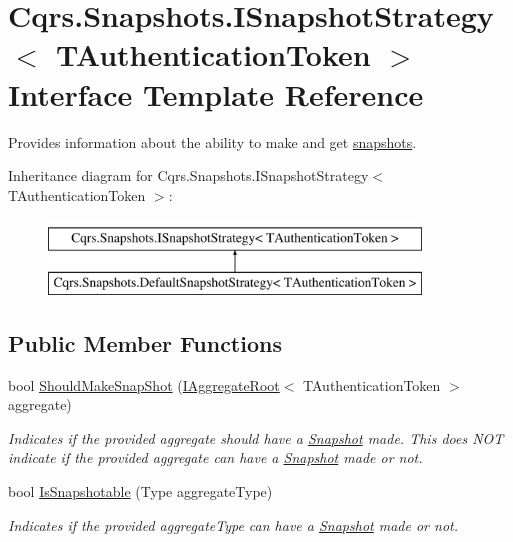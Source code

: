 \hypertarget{interfaceCqrs_1_1Snapshots_1_1ISnapshotStrategy}{}\section{Cqrs.\+Snapshots.\+I\+Snapshot\+Strategy$<$ T\+Authentication\+Token $>$ Interface Template Reference}
\label{interfaceCqrs_1_1Snapshots_1_1ISnapshotStrategy}


Provides information about the ability to make and get \hyperlink{classCqrs_1_1Snapshots_1_1Snapshot}{snapshots}.  


Inheritance diagram for Cqrs.\+Snapshots.\+I\+Snapshot\+Strategy$<$ T\+Authentication\+Token $>$\+:\begin{figure}[H]
\begin{center}
\leavevmode
\includegraphics[height=2.000000cm]{interfaceCqrs_1_1Snapshots_1_1ISnapshotStrategy}
\end{center}
\end{figure}
\subsection*{Public Member Functions}
\begin{DoxyCompactItemize}
\item 
bool \hyperlink{interfaceCqrs_1_1Snapshots_1_1ISnapshotStrategy_ab1d54cd76c7ac832329cb3a6de0effcd_ab1d54cd76c7ac832329cb3a6de0effcd}{Should\+Make\+Snap\+Shot} (\hyperlink{interfaceCqrs_1_1Domain_1_1IAggregateRoot}{I\+Aggregate\+Root}$<$ T\+Authentication\+Token $>$ aggregate)
\begin{DoxyCompactList}\small\item\em Indicates if the provided {\itshape aggregate}  should have a \hyperlink{classCqrs_1_1Snapshots_1_1Snapshot}{Snapshot} made. This does N\+OT indicate if the provided {\itshape aggregate}  can have a \hyperlink{classCqrs_1_1Snapshots_1_1Snapshot}{Snapshot} made or not. \end{DoxyCompactList}\item 
bool \hyperlink{interfaceCqrs_1_1Snapshots_1_1ISnapshotStrategy_a02121821312c4ce2811b31eeaffabe51_a02121821312c4ce2811b31eeaffabe51}{Is\+Snapshotable} (Type aggregate\+Type)
\begin{DoxyCompactList}\small\item\em Indicates if the provided {\itshape aggregate\+Type}  can have a \hyperlink{classCqrs_1_1Snapshots_1_1Snapshot}{Snapshot} made or not. \end{DoxyCompactList}\end{DoxyCompactItemize}


